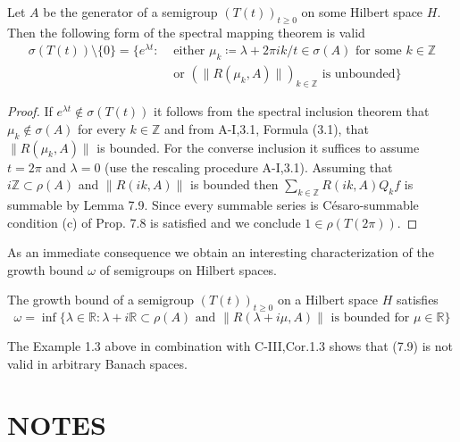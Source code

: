 \begin{theorem}\label{thm:a3-7.10}
	Let $A$ be the generator of a semigroup $(T(t))_{t\geq 0}$ on some Hilbert space $H$.
	Then the following form of the spectral mapping theorem is valid
	\begin{align*}
	\sigma(T(t))\setminus\{0\} = \{e^{\lambda t} :  
	& \text{ either } \mu_{k}\coloneqq \lambda + 2\pi i k/t \in \sigma(A) \text{ for some } k \in \mathbb{Z}\\
	& \text{ or } (\|R(\mu_{k},A)\|)_{k\in\mathbb{Z}} \text{ is unbounded}\}
	\end{align*}
\end{theorem}

\begin{proof}
	If $e^{\lambda t} \not\in \sigma(T(t))$ it follows from the spectral inclusion theorem that $\mu_{k} \not\in \sigma(A)$ for every $k \in \mathbb{Z}$ and from A-I,3.1, Formula (3.1), that $\|R(\mu_{k},A)\|$ is bounded.
	For the converse inclusion it suffices to assume $t = 2\pi$ and $\lambda = 0$ (use the rescaling procedure A-I,3.1).
	Assuming that $i\mathbb{Z} \subset \rho(A)$ and $\|R(ik,A)\|$ is bounded then $\sum_{k\in\mathbb{Z}} R(ik,A)Q_{k}f$ is summable by Lemma 7.9.
	Since every summable series is Césaro-summable condition (c) of Prop. 7.8 is satisfied and we conclude $1 \in \rho(T(2\pi))$.
\end{proof}

\newpage
As an immediate consequence we obtain an interesting characterization of the growth bound $\omega$ of semigroups on Hilbert spaces.

\begin{corollary}\label{cor:a3-7.11}
	The growth bound of a semigroup $(T(t))_{t\geq 0}$ on a Hilbert space $H$ satisfies
	\begin{equation}\label{eq:a3-7.9}
		\omega = \inf \{\lambda \in \mathbb{R} : \lambda + i\mathbb{R} \subset \rho(A) \text{ and } \|R(\lambda+i\mu,A)\| \text{ is bounded for } \mu \in \mathbb{R}\}
	\end{equation}
\end{corollary}

The Example 1.3 above in combination with C-III,Cor.1.3 shows that (7.9) is not valid in arbitrary Banach spaces.

\section*{NOTES}

